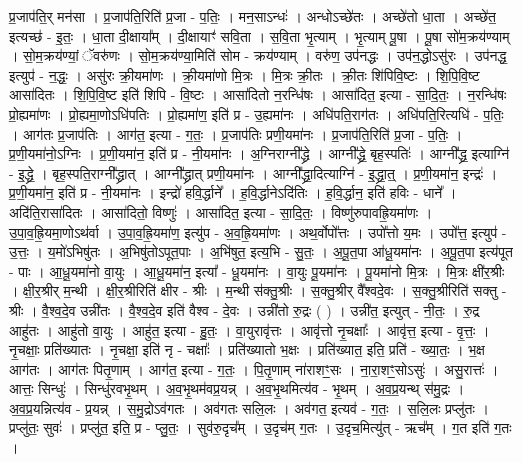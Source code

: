 \documentclass[17pt]{extarticle}
\begin{document}
प्र॒जाप॑ति॒र् मन॑सा । प्र॒जाप॑ति॒रिति॑ प्र॒जा - प॒तिः॒ । मन॒साऽन्धः॑ । अन्धोऽच्छे॑तः । अच्छे॑तो धा॒ता । अच्छे॑त॒ इत्यच्छ॑ - इ॒तः॒ । धा॒ता दी॒क्षाया᳚म् । दी॒क्षायाꣳ॑ सवि॒ता । स॒वि॒ता भृ॒त्याम् । भृ॒त्याम् पू॒षा । पू॒षा सो॑म॒क्रय॑ण्याम् । सो॒म॒क्रय॑ण्यां॒ ॅवरु॑णः । सो॒म॒क्रय॑ण्या॒मिति॑ सोम - क्रय॑ण्याम् । वरु॑ण॒ उप॑नद्धः । उप॑न॒द्धोऽसु॑रः । उप॑नद्ध॒ इत्युप॑ - न॒द्धः॒ । असु॑रः क्री॒यमा॑णः । क्री॒यमा॑णो मि॒त्रः । मि॒त्रः क्री॒तः । क्री॒तः शि॑पिवि॒ष्टः । शि॒पि॒वि॒ष्ट आसा॑दितः । शि॒पि॒वि॒ष्ट इति॑ शिपि - वि॒ष्टः । आसा॑दितो न॒रन्धि॑षः । आसा॑दित॒ इत्या - सा॒दि॒तः॒ । न॒रन्धि॑षः प्रो॒ह्यमा॑णः । प्रो॒ह्यमा॒णोऽधि॑पतिः । प्रो॒ह्यमा॑ण॒ इति॑ प्र - उ॒ह्यमा॑नः । अधि॑पति॒राग॑तः । अधि॑पति॒रित्यधि॑ - प॒तिः॒ । आग॑तः प्र॒जाप॑तिः । आग॑त॒ इत्या - ग॒तः॒ । प्र॒जाप॑तिः प्रणी॒यमा॑नः । प्र॒जाप॑ति॒रिति॑ प्र॒जा - प॒तिः॒ । प्र॒णी॒यमा॑नो॒ऽग्निः । प्र॒णी॒यमा॑न॒ इति॑ प्र - नी॒यमा॑नः । अ॒ग्निराग्नी᳚द्ध्रे । आग्नी᳚द्ध्रे॒ बृह॒स्पतिः॑ । आग्नी᳚द्ध्र॒ इत्याग्नि॑ - इ॒द्ध्रे॒ । बृह॒स्पति॒राग्नी᳚द्ध्रात् । आग्नी᳚द्ध्रात् प्रणी॒यमा॑नः । आग्नी᳚द्ध्रा॒दित्याग्नि॑ - इ॒द्ध्रा॒त्॒ । प्र॒णी॒यमा॑न॒ इन्द्रः॑ । प्र॒णी॒यमा॑न॒ इति॑ प्र - नी॒यमा॑नः । इन्द्रो॑ हवि॒र्द्धाने᳚ । ह॒वि॒र्द्धानेऽदि॑तिः । ह॒वि॒र्द्धान॒ इति॑ हविः - धाने᳚ । अदि॑ति॒रासा॑दितः । आसा॑दितो॒ विष्णुः॑ । आसा॑दित॒ इत्या - सा॒दि॒तः॒ । विष्णु॑रुपावह्रि॒यमा॑णः । उ॒पा॒व॒ह्रि॒यमा॒णोऽथ॑र्वा । उ॒पा॒व॒ह्रि॒यमा॑ण॒ इत्यु॑प - अ॒व॒ह्रि॒यमा॑णः । अथ॒र्वोपो᳚त्तः । उपो᳚त्तो य॒मः । उपो᳚त्त॒ इत्युप॑ - उ॒त्तः॒ । य॒मो॑ऽभिषु॑तः । अ॒भिषु॑तोऽपूत॒पाः । अ॒भि॑षुत॒ इत्य॒भि - सु॒तः॒ । अ॒पू॒त॒पा आ॑धू॒यमा॑नः । अ॒पू॒त॒पा इत्य॑पूत - पाः । आ॒धू॒यमा॑नो वा॒युः । आ॒धू॒यमा॑न॒ इत्या᳚ - धू॒यमा॑नः । वा॒युः पू॒यमा॑नः । पू॒यमा॑नो मि॒त्रः । मि॒त्रः क्षी॑र॒श्रीः । क्षी॒र॒श्रीर् म॒न्थी । क्षी॒र॒श्रीरिति॑ क्षीर - श्रीः । म॒न्थी स॑क्तु॒श्रीः । स॒क्तु॒श्रीर् वै᳚श्वदे॒वः । स॒क्तु॒श्रीरिति॑ सक्तु - श्रीः । वै॒श्व॒दे॒व उन्नी॑तः । वै॒श्व॒दे॒व इति॑ वैश्व - दे॒वः । उन्नी॑तो रु॒द्रः ( ) । उन्नी॑त॒ इत्युत् - नी॒तः॒ । रु॒द्र आहु॑तः । आहु॑तो वा॒युः । आहु॑त॒ इत्या - हु॒तः॒ । वा॒युरावृ॑त्तः । आवृ॑त्तो नृ॒चक्षाः᳚ । आवृ॑त्त॒ इत्या - वृ॒त्तः॒ । नृ॒चक्षाः॒ प्रति॑ख्यातः । नृ॒चक्षा॒ इति॑ नृ - चक्षाः᳚ । प्रति॑ख्यातो भ॒क्षः । प्रति॑ख्यात॒ इति॒ प्रति॑ - ख्या॒तः॒ । भ॒क्ष आग॑तः । आग॑तः पितृ॒णाम् । आग॑त॒ इत्या - ग॒तः॒ । पि॒तृ॒णाम् ना॑राशꣳ॒॒सः । ना॒रा॒शꣳ॒॒सोऽसुः॑ । असु॒रात्तः॑ । आत्तः॒ सिन्धुः॑ । सिन्धु॑रवभृ॒थम् । अ॒व॒भृ॒थम॑वप्र॒यन्न् । अ॒व॒भृ॒थमित्य॑व - भृ॒थम् । अ॒व॒प्र॒यन्थ् स॑मु॒द्रः । अ॒व॒प्र॒यन्नित्य॑व - प्र॒यन्न् । स॒मु॒द्रोऽव॑गतः । अव॑गतः सलि॒लः । अव॑गत॒ इत्यव॑ - ग॒तः॒ । स॒लि॒लः प्रप्लु॑तः । प्रप्लु॑तः॒ सुवः॑ । प्रप्लु॑त॒ इति॒ प्र - प्लु॒तः॒ । सुव॑रु॒दृच᳚म् । उ॒दृच॑म् ग॒तः । उ॒दृच॒मित्यु॑त् - ऋच᳚म् । ग॒त इति॑ ग॒तः । \newline
\end{document}
